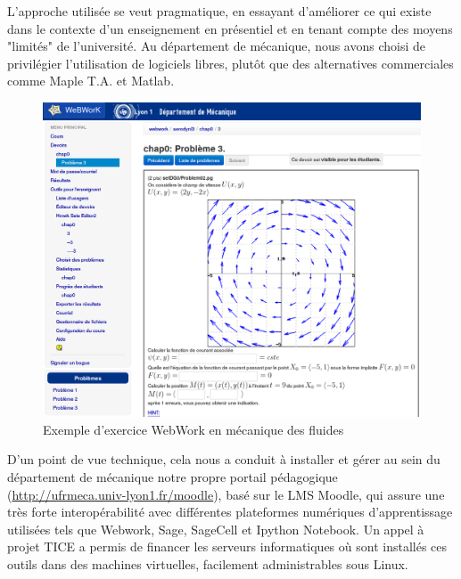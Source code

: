 \documentclass[12pt,oneside,french]{article}
\begin{document}
L'approche utilisée se veut pragmatique, en essayant d'améliorer ce qui existe dans le
contexte d'un enseignement en présentiel et en tenant compte des moyens
"limités" de l'université. Au département de mécanique, nous avons choisi 
de privilégier l'utilisation de logiciels libres, plutôt que des alternatives commerciales
 comme Maple T.A. et Matlab.
\begin{figure}
	\begin{center}
		\includegraphics[width=0.4\paperwidth]{webwork1.png}
	\end{center}
	\caption{Exemple d'exercice WebWork en mécanique des fluides}\label{fig1}
\end{figure}

D'un point de vue technique, cela nous a conduit à
installer et gérer au sein du département de mécanique notre propre portail pédagogique
(\href{http://ufrmeca.univ-lyon1.fr/moodle}{http://ufrmeca.univ-lyon1.fr/moodle}),
basé sur le LMS Moodle, qui assure une très forte interopérabilité avec
différentes plateformes numériques d'apprentissage utilisées tels que 
Webwork\cite{webwork}, Sage, SageCell\cite{sage} et Ipython
Notebook\cite{ipython}. Un appel à projet TICE a permis de financer les serveurs informatiques où sont
installés ces outils dans  des machines virtuelles, facilement administrables sous Linux.
\end{document}
